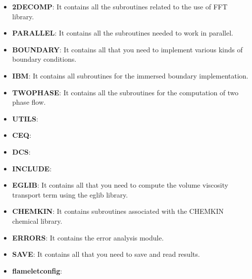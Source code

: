 \begin{itemize}
  \item \textbf{2DECOMP}: It contains all the subroutines related to the use of FFT library.
  \item \textbf{PARALLEL}: It contains all the subroutines needed to work in parallel.
  \item \textbf{BOUNDARY}: It contains all that you need to implement various kinds of boundary conditions.
  \item \textbf{IBM}: It contains all subroutines for the immersed boundary implementation.
  \item \textbf{TWOPHASE}: It contains all the subroutines for the computation of two phase flow.
  \item \textbf{UTILS}:
  \item \textbf{CEQ}:
  \item \textbf{DCS}:
  \item \textbf{INCLUDE}:
  \item \textbf{EGLIB}: It contains all that you need to compute the volume viscosity transport term using the eglib library.
  \item \textbf{CHEMKIN}: It contains subroutines associated with the CHEMKIN chemical library.
  \item \textbf{ERRORS}: It contains the error analysis module.
  \item \textbf{SAVE}: It contains all that you need to save and read results.
  \item \textbf{flameletconfig}:
\end{itemize}

